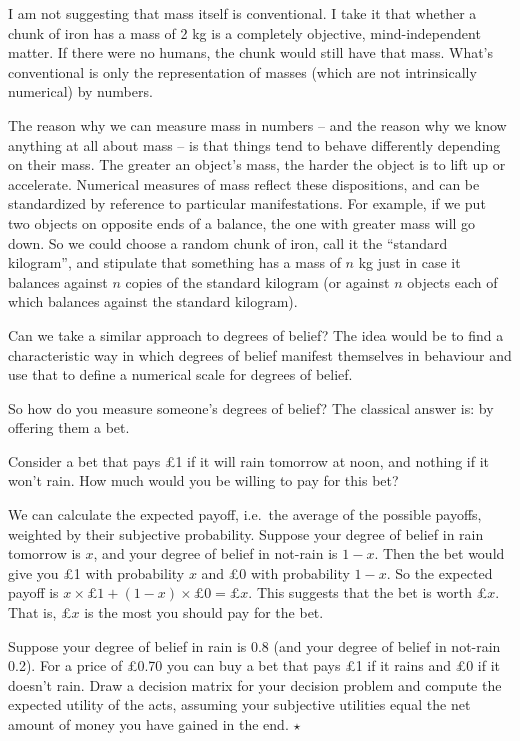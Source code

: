 I am not suggesting that mass itself is conventional. I take it that whether a chunk
of iron has a mass of 2 kg is a completely objective, mind-independent
matter. If there were no humans, the chunk would still have that
mass. What's conventional is only the representation of masses (which
are not intrinsically numerical) by numbers.

The reason why we can measure mass in numbers -- and the reason why we
know anything at all about mass -- is that things tend to behave
differently depending on their mass. The greater an object's mass, the
harder the object is to lift up or accelerate. Numerical measures of
mass reflect these dispositions, and can be standardized by reference
to particular manifestations. For example, if we put two objects on
opposite ends of a balance, the one with greater mass will go down. So
we could choose a random chunk of iron, call it the ``standard
kilogram'', and stipulate that something has a mass of $n$ kg just in
case it balances against $n$ copies of the standard kilogram (or
against $n$ objects each of which balances against the standard
kilogram).

Can we take a similar approach to degrees of belief? The idea would be
to find a characteristic way in which degrees of belief manifest
themselves in behaviour and use that to define a numerical scale for
degrees of belief.

So how do you measure someone's degrees of belief? The classical
answer is: by offering them a bet. 

Consider a bet that pays £1 if it will rain tomorrow at noon, and
nothing if it won't rain. How much would you be willing to pay for
this bet?

We can calculate the expected payoff, i.e.\ the average of the
possible payoffs, weighted by their subjective probability.  Suppose
your degree of belief in rain tomorrow is $x$, and your degree of
belief in not-rain is $1-x$. Then the bet would give you £1 with
probability $x$ and £0 with probability $1-x$. So the expected payoff
is $x \times \text{£1} + (1-x) \times \text{£0} = \text{£}x$. This
suggests that the bet is worth £$x$. That is, £$x$ is the most you
should pay for the bet.

\begin{exercise}
  Suppose your degree of belief in rain is $0.8$ (and your degree of
  belief in not-rain 0.2). For a price of £0.70 you can buy a bet that
  pays £1 if it rains and £0 if it doesn't rain. Draw a decision
  matrix for your decision problem and compute the expected utility of
  the acts, assuming your subjective utilities equal the net amount of
  money you have gained in the end. $\star$
\end{exercise}

